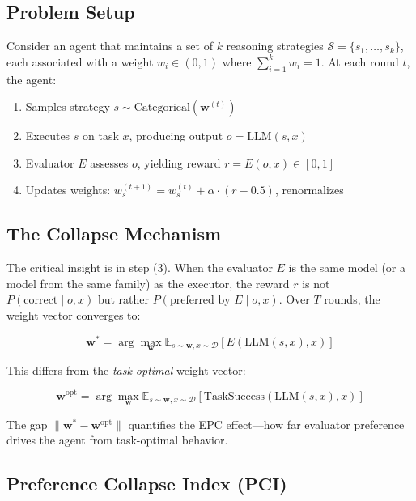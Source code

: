 \documentclass[11pt,a4paper]{article}
\begin{document}
\subsection{Problem Setup}

Consider an agent that maintains a set of $k$ reasoning strategies $\mathcal{S} = \{s_1, \ldots, s_k\}$, each associated with a weight $w_i \in (0,1)$ where $\sum_{i=1}^k w_i = 1$. At each round $t$, the agent:

\begin{enumerate}[leftmargin=*, label=(\arabic*)]
    \item Samples strategy $s \sim \text{Categorical}(\mathbf{w}^{(t)})$
    \item Executes $s$ on task $x$, producing output $o = \text{LLM}(s, x)$
    \item Evaluator $E$ assesses $o$, yielding reward $r = E(o, x) \in [0,1]$
    \item Updates weights: $w_s^{(t+1)} = w_s^{(t)} + \alpha \cdot (r - 0.5)$, renormalizes
\end{enumerate}

\subsection{The Collapse Mechanism}

The critical insight is in step (3). When the evaluator $E$ is the same model (or a model from the same family) as the executor, the reward $r$ is not $P(\text{correct} \mid o, x)$ but rather $P(\text{preferred by } E \mid o, x)$. Over $T$ rounds, the weight vector converges to:

\begin{equation}
\mathbf{w}^* = \arg\max_{\mathbf{w}} \mathbb{E}_{s \sim \mathbf{w}, x \sim \mathcal{D}} [E(\text{LLM}(s, x), x)]
\end{equation}

This differs from the \textit{task-optimal} weight vector:

\begin{equation}
\mathbf{w}^{\text{opt}} = \arg\max_{\mathbf{w}} \mathbb{E}_{s \sim \mathbf{w}, x \sim \mathcal{D}} [\text{TaskSuccess}(\text{LLM}(s, x), x)]
\end{equation}

The gap $\|\mathbf{w}^* - \mathbf{w}^{\text{opt}}\|$ quantifies the EPC effect---how far evaluator preference drives the agent from task-optimal behavior.

\subsection{Preference Collapse Index (PCI)}
\end{document}

